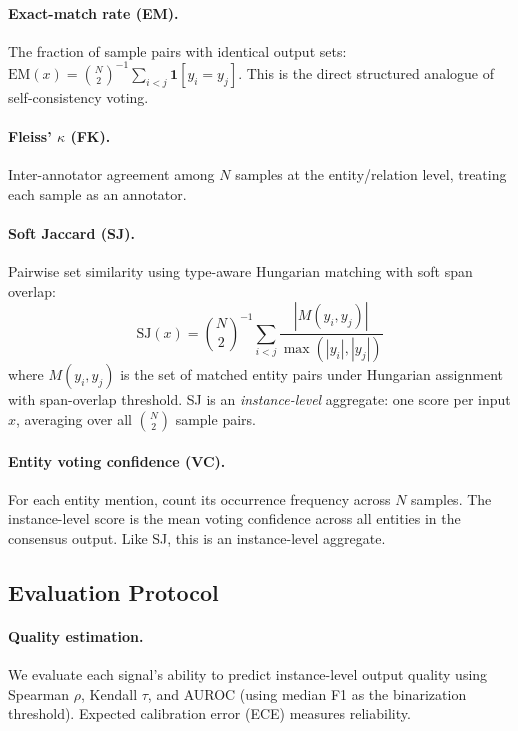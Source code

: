 \documentclass[11pt,a4paper]{article}
\begin{document}
\paragraph{Exact-match rate (EM).} The fraction of sample pairs with identical output sets: $\text{EM}(x) = \binom{N}{2}^{-1} \sum_{i<j} \mathbf{1}[y_i = y_j]$. This is the direct structured analogue of self-consistency voting.

\paragraph{Fleiss' $\kappa$ (FK).} Inter-annotator agreement among $N$ samples at the entity/relation level, treating each sample as an annotator.

\paragraph{Soft Jaccard (SJ).} Pairwise set similarity using type-aware Hungarian matching with soft span overlap:
\begin{equation}
\text{SJ}(x) = \binom{N}{2}^{-1} \sum_{i<j} \frac{|M(y_i, y_j)|}{\max(|y_i|, |y_j|)}
\end{equation}
where $M(y_i, y_j)$ is the set of matched entity pairs under Hungarian assignment with span-overlap threshold. SJ is an \emph{instance-level} aggregate: one score per input $x$, averaging over all $\binom{N}{2}$ sample pairs.

\paragraph{Entity voting confidence (VC).} For each entity mention, count its occurrence frequency across $N$ samples. The instance-level score is the mean voting confidence across all entities in the consensus output. Like SJ, this is an instance-level aggregate.

\subsection{Evaluation Protocol}

\paragraph{Quality estimation.} We evaluate each signal's ability to predict instance-level output quality using Spearman $\rho$, Kendall $\tau$, and AUROC (using median F1 as the binarization threshold). Expected calibration error (ECE) measures reliability.
\end{document}
